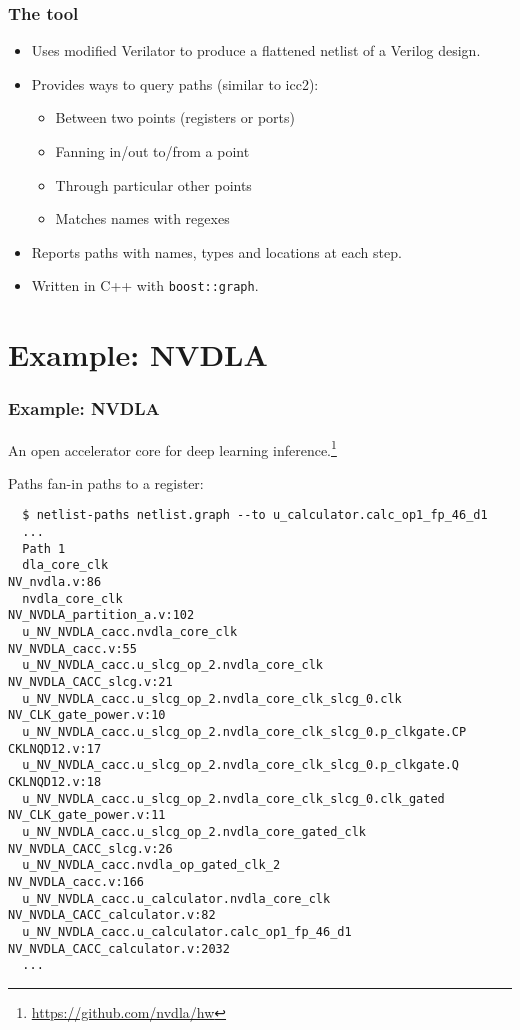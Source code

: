 \documentclass[professionalfonts]{beamer}
\begin{document}
\begin{frame}
  \frametitle{The tool}
  \begin{itemize}
  \item Uses modified Verilator to produce a flattened netlist of a Verilog design.
  \item Provides ways to query paths (similar to icc2):
    \begin{itemize}
    \item Between two points (registers or ports)
    \item Fanning in/out to/from a point
    \item Through particular other points
    \item Matches names with regexes
    \end{itemize}
  \item Reports paths with names, types and locations at each step.
  \item Written in C++ with \texttt{boost::graph}.
  \end{itemize}
\end{frame}

\section{Example: NVDLA}
\begin{frame}[fragile]
  \frametitle{Example: NVDLA}
  An open accelerator core for deep learning inference.\footnote{\url{https://github.com/nvdla/hw}}

  Paths fan-in paths to a register:
  \tiny
  \begin{verbatim}
  $ netlist-paths netlist.graph --to u_calculator.calc_op1_fp_46_d1
  ...
  Path 1
  dla_core_clk                                                   NV_nvdla.v:86
  nvdla_core_clk                                                 NV_NVDLA_partition_a.v:102
  u_NV_NVDLA_cacc.nvdla_core_clk                                 NV_NVDLA_cacc.v:55
  u_NV_NVDLA_cacc.u_slcg_op_2.nvdla_core_clk                     NV_NVDLA_CACC_slcg.v:21
  u_NV_NVDLA_cacc.u_slcg_op_2.nvdla_core_clk_slcg_0.clk          NV_CLK_gate_power.v:10
  u_NV_NVDLA_cacc.u_slcg_op_2.nvdla_core_clk_slcg_0.p_clkgate.CP CKLNQD12.v:17
  u_NV_NVDLA_cacc.u_slcg_op_2.nvdla_core_clk_slcg_0.p_clkgate.Q  CKLNQD12.v:18
  u_NV_NVDLA_cacc.u_slcg_op_2.nvdla_core_clk_slcg_0.clk_gated    NV_CLK_gate_power.v:11
  u_NV_NVDLA_cacc.u_slcg_op_2.nvdla_core_gated_clk               NV_NVDLA_CACC_slcg.v:26
  u_NV_NVDLA_cacc.nvdla_op_gated_clk_2                           NV_NVDLA_cacc.v:166
  u_NV_NVDLA_cacc.u_calculator.nvdla_core_clk                    NV_NVDLA_CACC_calculator.v:82
  u_NV_NVDLA_cacc.u_calculator.calc_op1_fp_46_d1                 NV_NVDLA_CACC_calculator.v:2032
  ...
  \end{verbatim}
\end{frame}
\end{document}
